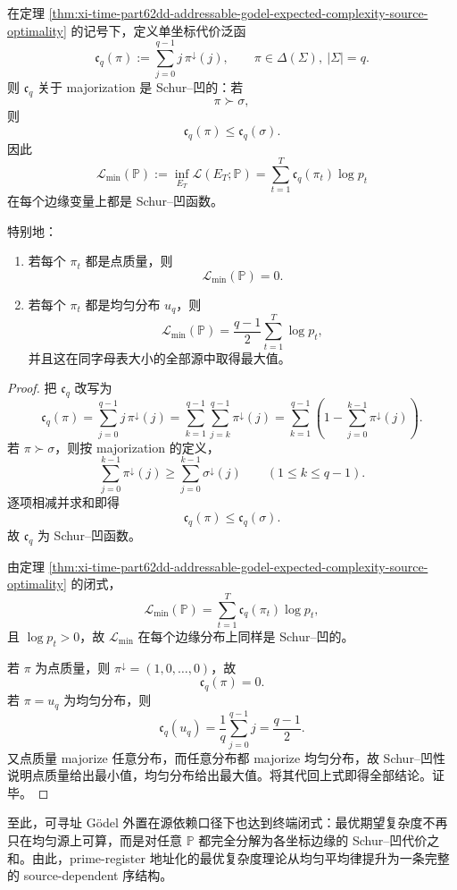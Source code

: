 \begin{corollary}\label{cor:xi-time-part62dd-addressable-godel-majorization-schur-concavity}
在定理 \ref{thm:xi-time-part62dd-addressable-godel-expected-complexity-source-optimality} 的记号下，定义单坐标代价泛函
\[
\mathfrak c_q(\pi):=\sum_{j=0}^{q-1}j\,\pi^\downarrow(j),
\qquad
\pi\in\Delta(\Sigma),\ |\Sigma|=q.
\]
则 \(\mathfrak c_q\) 关于 majorization 是 Schur--凹的：若
\[
\pi\succ \sigma,
\]
则
\[
\mathfrak c_q(\pi)\le \mathfrak c_q(\sigma).
\]
因此
\[
\mathcal L_{\min}(\mathbb P)
:=
\inf_{E_T}\mathcal L(E_T;\mathbb P)
=
\sum_{t=1}^{T}\mathfrak c_q(\pi_t)\log p_t
\]
在每个边缘变量上都是 Schur--凹函数。

特别地：
\begin{enumerate}
  \item 若每个 \(\pi_t\) 都是点质量，则
  \[
  \mathcal L_{\min}(\mathbb P)=0.
  \]
  \item 若每个 \(\pi_t\) 都是均匀分布 \(u_q\)，则
  \[
  \mathcal L_{\min}(\mathbb P)
  =
  \frac{q-1}{2}\sum_{t=1}^{T}\log p_t,
  \]
  并且这在同字母表大小的全部源中取得最大值。
\end{enumerate}
\end{corollary}
\begin{proof}
把 \(\mathfrak c_q\) 改写为
\[
\mathfrak c_q(\pi)
=
\sum_{j=0}^{q-1}j\,\pi^\downarrow(j)
=
\sum_{k=1}^{q-1}\sum_{j=k}^{q-1}\pi^\downarrow(j)
=
\sum_{k=1}^{q-1}\left(1-\sum_{j=0}^{k-1}\pi^\downarrow(j)\right).
\]
若 \(\pi\succ \sigma\)，则按 majorization 的定义，
\[
\sum_{j=0}^{k-1}\pi^\downarrow(j)\ge \sum_{j=0}^{k-1}\sigma^\downarrow(j)
\qquad (1\le k\le q-1).
\]
逐项相减并求和即得
\[
\mathfrak c_q(\pi)\le \mathfrak c_q(\sigma).
\]
故 \(\mathfrak c_q\) 为 Schur--凹函数。

由定理 \ref{thm:xi-time-part62dd-addressable-godel-expected-complexity-source-optimality} 的闭式，
\[
\mathcal L_{\min}(\mathbb P)=\sum_{t=1}^{T}\mathfrak c_q(\pi_t)\log p_t,
\]
且 \(\log p_t>0\)，故 \(\mathcal L_{\min}\) 在每个边缘分布上同样是 Schur--凹的。

若 \(\pi\) 为点质量，则 \(\pi^\downarrow=(1,0,\dots,0)\)，故
\[
\mathfrak c_q(\pi)=0.
\]
若 \(\pi=u_q\) 为均匀分布，则
\[
\mathfrak c_q(u_q)=\frac1q\sum_{j=0}^{q-1}j=\frac{q-1}{2}.
\]
又点质量 majorize 任意分布，而任意分布都 majorize 均匀分布，故 Schur--凹性说明点质量给出最小值，均匀分布给出最大值。将其代回上式即得全部结论。证毕。
\end{proof}

\noindent
至此，可寻址 Gödel 外置在源依赖口径下也达到终端闭式：最优期望复杂度不再只在均匀源上可算，而是对任意 \(\mathbb P\) 都完全分解为各坐标边缘的 Schur--凹代价之和。由此，prime-register 地址化的最优复杂度理论从均匀平均律提升为一条完整的 source-dependent 序结构。

\endinput
